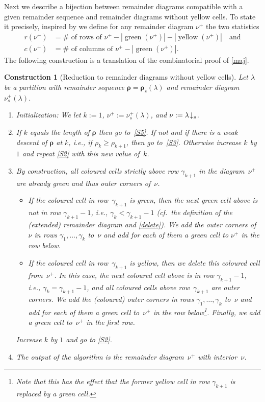 \documentclass[12pt,reqno]{amsart}
\numberwithin{equation}{section}
\newtheorem{construction}{Construction}
\theoremstyle{definition}
\DeclareMathOperator{\gout}{green}
\DeclareMathOperator{\yout}{yellow}
\newcommand{\rem}{{\boldsymbol\rho}}
\newcommand{\posi}{{\gamma}}
\newcommand{\lab}[1]{\hbox{${\lambda}\!\downarrow_{#1}$}}
\begin{document}
Next we describe a bijection between remainder diagrams compatible
with a given remainder sequence and remainder diagrams without yellow
cells.  To state it precisely, inspired by
 we define for any remainder
diagram $\nu^+$ the two statistics
\begin{align*}
  r(\nu^+) &= \# \text{ of rows of } \nu^+ -
             |\gout(\nu^+)|-|\yout(\nu^+)|\quad\text{and}\\
  c(\nu^+) &= \# \text{ of columns of } \nu^+ - |\gout(\nu^+)|.
\end{align*}
The following construction is a translation of the combinatorial
proof of \cref{maj}.
\begin{construction}[\sc Reduction to remainder diagrams without yellow
  cells]
  \label{reduce}
  Let $\lambda$ be a partition with remainder sequence
  $\rem=\rem_s(\lambda)$ and remainder diagram $\nu^+_s(\lambda)$.

\begin{enumerate}[label=\textnormal{({\arabic*})},resume]
\item\label{S1} Initialization: We let $k:=1$,
  $\nu^+:=\nu_s^+(\lambda)$,
  and $\nu:=\lab{s}$.
\item\label{S2}If $k$ equals the length of $\rem$ then go to~\ref{S5}.
If not and if there is a weak descent of $\rem$ at $k$, i.e., if
$\rho_{k} \ge \rho_{k+1}$, then go to~\ref{S3}. Otherwise increase $k$
  by~$1$ and repeat \ref{S2} with this new value of~$k$.
\item By construction, all coloured cells strictly
  above row $\posi_{k+1}$ in the diagram~$\nu^+$ are already green and
  thus outer corners of~$\nu$.

\begin{itemize}
\item[\em(3A)]\label{S3}
  If the coloured cell in row~$\posi_{k+1}$
  is green, then the next green cell above is
  not in row $\posi_{k+1}-1$, i.e., $\posi_{k} < \posi_{k+1}-1$
(cf.\ the definition of the (extended) remainder diagram and
\cref{delete}).  We add 
  the outer corners of~$\nu$ in rows $\posi_1,\dots,\posi_{k}$ to~$\nu$
  and add for each of them a green
  cell to $\nu^+$ in the row below.

\item[\em(3B)]\label{S4} If the coloured cell in row~$\posi_{k+1}$ is yellow, then
  we delete this coloured cell from~$\nu^+$. 
  In this case, the next coloured cell above is in row $\posi_{k+1}-1$,
  i.e., $\posi_{k}= \posi_{k+1}-1$, and all coloured cells above row~$\posi_{k+1}$ are outer corners. 
  We add the (coloured) outer corners in rows
  $\posi_1,\dots,\posi_{k}$ to~$\nu$
  and add for each of them a green cell to~$\nu^+$ in the row
  below\footnote{Note that this has the effect that the former yellow
    cell in row $\posi_{k+1}$ is replaced by a green cell.}.
  Finally, we add a green cell to~$\nu^+$ in the first row.
\end{itemize}
Increase $k$ by $1$ and go to \ref{S2}.
\item\label{S5} The output of the algorithm is the remainder
  diagram~$\nu^+$ with interior~$\nu$.
\end{enumerate}
\end{construction} 
\end{document}
